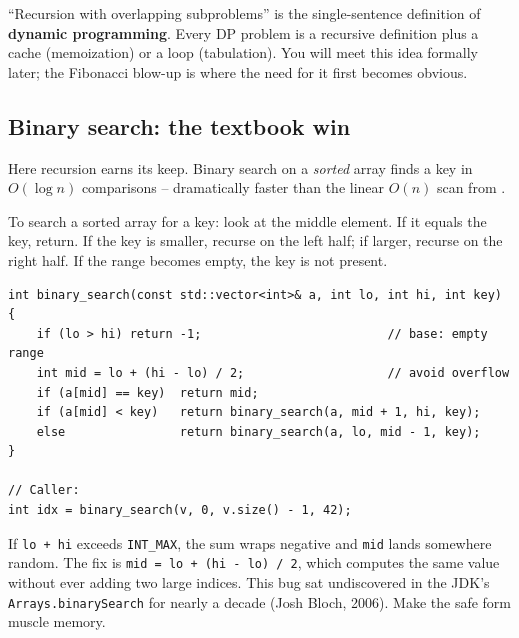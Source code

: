 \documentclass[11pt]{article}
\begin{document}
\begin{notebox}
``Recursion with overlapping subproblems'' is the single-sentence
definition of \textbf{dynamic programming}. Every DP problem is a
recursive definition plus a cache (memoization) or a loop (tabulation).
You will meet this idea formally later; the Fibonacci blow-up is
where the need for it first becomes obvious.
\end{notebox}

\subsection{Binary search: the textbook win}

Here recursion earns its keep. Binary search on a \emph{sorted} array
finds a key in $O(\log n)$ comparisons -- dramatically faster than the
linear $O(n)$ scan from .

\begin{defnbox}
To search a sorted array for a key: look at the middle element. If it
equals the key, return. If the key is smaller, recurse on the left
half; if larger, recurse on the right half. If the range becomes
empty, the key is not present.
\end{defnbox}

\begin{examplebox}
\begin{verbatim}
int binary_search(const std::vector<int>& a, int lo, int hi, int key) {
    if (lo > hi) return -1;                          // base: empty range
    int mid = lo + (hi - lo) / 2;                    // avoid overflow
    if (a[mid] == key)  return mid;
    if (a[mid] < key)   return binary_search(a, mid + 1, hi, key);
    else                return binary_search(a, lo, mid - 1, key);
}

// Caller:
int idx = binary_search(v, 0, v.size() - 1, 42);
\end{verbatim}
\end{examplebox}

\begin{warnbox}[\texttt{mid = (lo + hi) / 2} is an overflow bug]
If \texttt{lo + hi} exceeds \texttt{INT\_MAX}, the sum wraps negative
and \texttt{mid} lands somewhere random. The fix is
\texttt{mid = lo + (hi - lo) / 2}, which computes the same value
without ever adding two large indices. This bug sat undiscovered in
the JDK's \texttt{Arrays.binarySearch} for nearly a decade (Josh
Bloch, 2006). Make the safe form muscle memory.
\end{warnbox}
\end{document}
